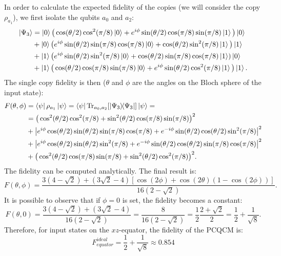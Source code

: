 In order to calculate the expected fidelity of the copies (we will consider the copy $\rho_{a_1}$), we first isolate the qubits $a_0$ and $a_2$:
\[
    \begin{split}
    \ket{\Psi_3}&=\ket{0}\big(\cos(\theta/2)\cos^2(\pi/8)\ket{0}+e^{i\phi}\sin(\theta/2)\cos(\pi/8)\sin(\pi/8)\ket{1}\big)\ket{0}\\
    &+\ket{0}\big(e^{i\phi}\sin(\theta/2)\sin(\pi/8)\cos(\pi/8)\ket{0}+\cos(\theta/2)\sin^2(\pi/8)\ket{1}\big)\ket{1}\\
    &+\ket{1}\big(e^{i\phi}\sin(\theta/2)\sin^2(\pi/8)\ket{0}+\cos(\theta/2)\sin(\pi/8)\cos(\pi/8)\ket{1})\ket{0}\\
    &+\ket{1}\big(\cos(\theta/2)\cos(\pi/8)\sin(\pi/8)\ket{0}+e^{i\phi}\sin(\theta/2)\cos^2(\pi/8)\ket{1}\big)\ket{1}.
    \end{split}
\]
The single copy fidelity is then ($\theta$ and $\phi$ are the angles on the Bloch sphere of the input state):
\[
    \begin{split}
    F(\theta,\phi)&=\bra{\psi}\rho_{a_1}\ket{\psi}=\bra{\psi}\Tr_{a_0,a_2}[\ketbra{\Psi_3}]\ket{\psi}=\\
    &=\big(\cos^2(\theta/2)\cos^2(\pi/8)+\sin^2(\theta/2)\cos(\pi/8)\sin(\pi/8)\big)^2\\
    &+\big|e^{i\phi}\cos(\theta/2)\sin(\theta/2)\sin(\pi/8)\cos(\pi/8)+e^{-i\phi}\sin(\theta/2)\cos(\theta/2)\sin^2(\pi/8)\big|^2\\
    &+\big|e^{i\phi}\cos(\theta/2)\sin(\theta/2)\sin^2(\pi/8)+e^{-i\phi}\sin(\theta/2)\cos(\theta/2)\sin(\pi/8)\cos(\pi/8)\big|^2\\
    &+\big(\cos^2(\theta/2)\cos(\pi/8)\sin(\pi/8)+\sin^2(\theta/2)\cos^2(\pi/8)\big)^2.
    \end{split}
\]
The fidelity can be computed analytically. The final result is:
\[
    F(\theta,\phi)=\frac{3\left(4-\sqrt{2}\right)+\left(3\sqrt{2}-4\right)\left[\cos(2\phi)+\cos(2\theta)\left(1-\cos(2\phi)\right)\right]}{     16(2-\sqrt{2})   }.
\]
It is possible to observe that if $\phi=0$ is set, the fidelity becomes a constant:
\[
    F(\theta,0)=\frac{3\left(4-\sqrt{2}\right)+\left(3\sqrt{2}-4\right)}{16(2-\sqrt{2})}=\frac{8}{16(2-\sqrt{2})}=\frac{1}{2}\frac{2+\sqrt{2}}{2}=\frac{1}{2}+\frac{1}{\sqrt{8}}.
\]
Therefore, for input states on the $xz$-equator, the fidelity of the PCQCM is:
\begin{equation}
    F_{equator}^{ideal}=\frac{1}{2}+\frac{1}{\sqrt{8}}\approx 0.854
\end{equation}

